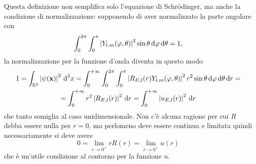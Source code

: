 Questa definizione non semplifica solo l'equazione di Schr\"odinger, ma anche la condizione di normalizzazione: supponendo di aver normalizzato la parte angolare con
\begin{equation}
	\int_0^{2\pi}\int_0^\pi\left|{Y_{l,m}(\varphi,\theta)}\right|^2\sin\theta\,\textup{d}\varphi\,\textup{d}\theta=1,
	\label{eq:normalizzazione-parte-angolare}
\end{equation}
la normalizzazione per la funzione d'onda diventa in questo modo
\begin{multline}
	1=\int_{\mathbb{R}^3}\left|{\psi(\mathbf{x})}\right|^2\,\textup{d}^3x=\int_0^{+\infty}\int_0^{2\pi}\int_0^\pi\left|{R_{E,l}(r)Y_{l,m}(\varphi,\theta)}\right|^2r^2\sin\theta\,\textup{d}\varphi\,\textup{d}\theta\,\textup{d} r=\\
	=\int_0^{+\infty}r^2\left|{R_{E,l}(r)}\right|^2\,\textup{d} r=\int_0^{+\infty}\left|{u_{E,l}(r)}\right|^2\,\textup{d} r
	\label{eq:normalizzazione-parte-radiale}
\end{multline}
che tanto somiglia al caso unidimensionale.
Non c'è alcuna ragione per cui $R$ debba essere nulla per $r=0$, ma perlomeno deve essere continua e limitata quindi necessariamente si deve avere
\begin{equation}
	0=\lim_{r\to 0^+}rR(r)=\lim_{r\to 0^+}u(r)
\end{equation}
che è un'utile condizione al contorno per la funzione $u$.

